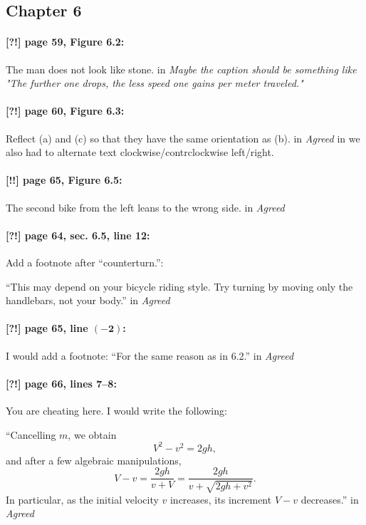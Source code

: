 \documentclass[twoside]{article}
\begin{document}
\subsection*{Chapter 6}

\paragraph{[?!] page 59, Figure 6.2:} The man does not look like stone.
 in {\it  Maybe the caption should be something like "The further one drops, the less speed one gains per meter traveled."} 

\paragraph{[?!] page 60, Figure 6.3:} Reflect (a) and (c) so that they have the same orientation as (b).
 in {\it  Agreed} 
 in we also had to alternate text clockwise/contrclockwise left/right.

\paragraph{[!!] page 65, Figure 6.5:}
The second bike from the left leans to the wrong side.
 in {\it  Agreed} 

\paragraph{[?!] page 64, sec. 6.5, line 12:} Add a footnote after “counterturn.”:

“This may depend on your bicycle riding style. Try turning by moving only the handlebars, not your body.”
 in {\it  Agreed} 

\paragraph{[?!] page 65, line $\bm{(-2)}$:} I would add a footnote: “For the same reason as in 6.2.”
 in {\it  Agreed} 

\paragraph{[?!] page 66, lines 7--8:} You are cheating here. I would write the following:

“Cancelling $m$, we obtain
\[
V^2 - v^2 = 2gh,
\]
and after a few algebraic manipulations,
\[
V - v = \frac{2gh}{v + V} = \frac{2gh}{v + \sqrt{2gh + v^2}}.
\]
In particular, as the initial velocity $v$ increases, its increment $V - v$ decreases.”
 in {\it  Agreed} 
\end{document}
